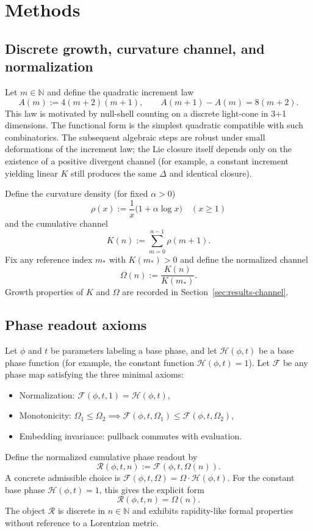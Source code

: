 \documentclass[11pt]{amsart}
\begin{document}
\section{Methods}\label{sec:methods}

\subsection{Discrete growth, curvature channel, and normalization}

Let \(m\in\mathbb{N}\) and define the quadratic increment law
\[
A(m):=4(m+2)(m+1),\qquad A(m+1)-A(m)=8(m+2).
\]
This law is motivated by null-shell counting on a discrete light-cone in 3+1 dimensions. The functional form is the simplest quadratic compatible with such combinatorics. The subsequent algebraic steps are robust under small deformations of the increment law; the Lie closure itself depends only on the existence of a positive divergent channel (for example, a constant increment yielding linear \(K\) still produces the same \(\Delta\) and identical closure).

Define the curvature density (for fixed \(\alpha>0\))
\[
\rho(x):=\frac1x\bigl(1+\alpha\log x\bigr)\quad(x\ge1)
\]
and the cumulative channel
\[
K(n):=\sum_{m=0}^{n-1}\rho(m+1).
\]
Fix any reference index \(m_\ast\) with \(K(m_\ast)>0\) and define the normalized channel
\[
\Omega(n):=\frac{K(n)}{K(m_\ast)}.
\]
Growth properties of \(K\) and \(\Omega\) are recorded in Section~\ref{sec:results-channel}.

\subsection{Phase readout axioms}

Let \(\phi\) and \(t\) be parameters labeling a base phase, and let \(\mathcal{H}(\phi,t)\) be a base phase function (for example, the constant function \(\mathcal{H}(\phi,t)=1\)). Let \(\mathcal{F}\) be any phase map satisfying the three minimal axioms:
\begin{itemize}
  \item Normalization: \(\mathcal{F}(\phi,t,1)=\mathcal{H}(\phi,t)\),
  \item Monotonicity: \(\Omega_1\le\Omega_2\implies\mathcal{F}(\phi,t,\Omega_1)\le\mathcal{F}(\phi,t,\Omega_2)\),
  \item Embedding invariance: pullback commutes with evaluation.
\end{itemize}

Define the normalized cumulative phase readout by
\[
\mathcal{R}(\phi,t,n):=\mathcal{F}(\phi,t,\Omega(n)).
\]
A concrete admissible choice is \(\mathcal{F}(\phi,t,\Omega)=\Omega\cdot\mathcal{H}(\phi,t)\). For the constant base phase \(\mathcal{H}(\phi,t)=1\), this gives the explicit form
\[
\mathcal{R}(\phi,t,n)=\Omega(n).
\]
The object \(\mathcal{R}\) is discrete in \(n\in\mathbb{N}\) and exhibits rapidity-like formal properties without reference to a Lorentzian metric.
\end{document}
